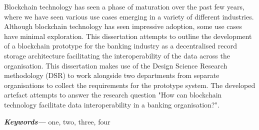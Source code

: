 \providecommand{\keywords}[1]
{
  \small	
  \textbf{\textit{Keywords---}} #1
}

Blockchain technology has seen a phase of maturation over the past few years, where we have seen various use cases emerging in a variety of different industries.
Although blockchain technology has seen impressive adoption, some use cases have minimal exploration. This dissertation attempts to outline the development of a blockchain prototype for the banking industry as a decentralised record storage architecture facilitating the interoperability of the data across the organisation. This dissertation makes use of the Design Science Research methodology (DSR) to work alongside two departments from separate organisations to collect the requirements for the prototype system. The developed artefact attempts to answer the research question "How can blockchain technology facilitate data interoperability in a banking organisation?". 

\keywords{one, two, three, four}